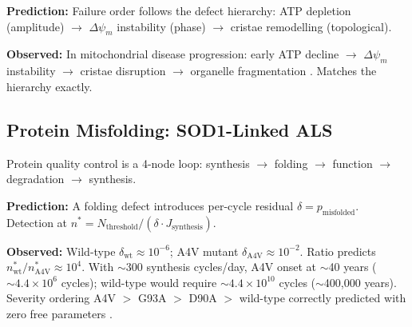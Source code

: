 \documentclass[10pt,twocolumn,a4paper]{article}
\theoremstyle{plain}
\theoremstyle{definition}
\theoremstyle{remark}
\begin{document}
\textbf{Prediction:} Failure order follows the defect hierarchy: ATP depletion (amplitude) $\to$ $\Delta\psi_m$ instability (phase) $\to$ cristae remodelling (topological).

\textbf{Observed:} In mitochondrial disease progression: early ATP decline $\to$ $\Delta\psi_m$ instability $\to$ cristae disruption $\to$ organelle fragmentation \citep{nunnari2012}. Matches the hierarchy exactly.

\subsection{Protein Misfolding: SOD1-Linked ALS}

Protein quality control is a 4-node loop: synthesis $\to$ folding $\to$ function $\to$ degradation $\to$ synthesis.

\textbf{Prediction:} A folding defect introduces per-cycle residual $\delta = p_{\mathrm{misfolded}}$. Detection at $n^* = N_{\mathrm{threshold}} / (\delta \cdot J_{\mathrm{synthesis}})$.

\textbf{Observed:} Wild-type $\delta_{\mathrm{wt}} \approx 10^{-6}$; A4V mutant $\delta_{\mathrm{A4V}} \approx 10^{-2}$. Ratio predicts $n^*_{\mathrm{wt}}/n^*_{\mathrm{A4V}} \approx 10^4$. With $\sim$300 synthesis cycles/day, A4V onset at $\sim$40 years ($\sim 4.4 \times 10^6$ cycles); wild-type would require $\sim 4.4 \times 10^{10}$ cycles ($\sim$400,000 years). Severity ordering A4V $>$ G93A $>$ D90A $>$ wild-type correctly predicted with zero free parameters \citep{andersen2003}.
\end{document}
